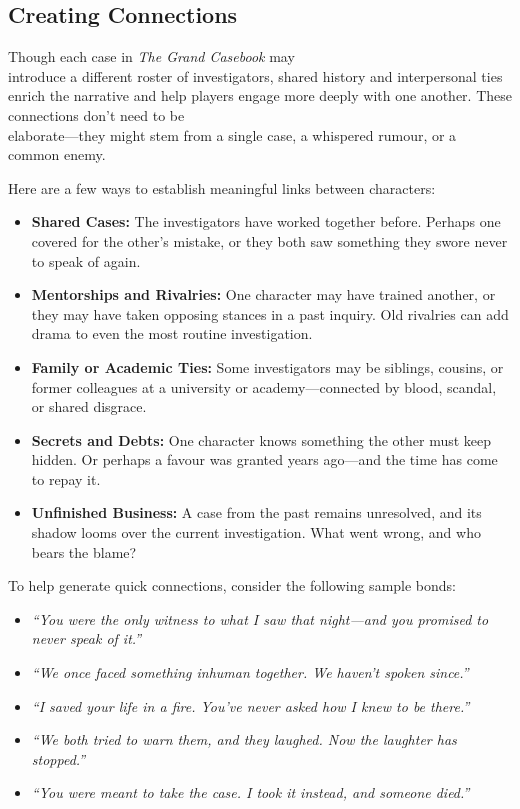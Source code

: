 \subsection{Creating Connections}

Though each case in \textit{The Grand Casebook} may\\ introduce a different roster of investigators, shared history and interpersonal ties enrich the narrative and help players engage more deeply with one another. These connections don't need to be\\ elaborate—they might stem from a single case, a whispered rumour, or a common enemy.

Here are a few ways to establish meaningful links between characters:

\begin{itemize}\raggedright
    \item \textbf{Shared Cases:} The investigators have worked together before. Perhaps one covered for the other's mistake, or they both saw something they swore never to speak of again.
    
    \item \textbf{Mentorships and Rivalries:} One character may have trained another, or they may have taken opposing stances in a past inquiry. Old rivalries can add drama to even the most routine investigation.
    
    \item \textbf{Family or Academic Ties:} Some investigators may be siblings, cousins, or former colleagues at a university or academy—connected by blood, scandal, or shared disgrace.
    
    \item \textbf{Secrets and Debts:} One character knows something the other must keep hidden. Or perhaps a favour was granted years ago—and the time has come to repay it.
    
    \item \textbf{Unfinished Business:} A case from the past remains unresolved, and its shadow looms over the current investigation. What went wrong, and who bears the blame?
\end{itemize}

To help generate quick connections, consider the following sample bonds:

\begin{itemize}\raggedright
    \item \textit{“You were the only witness to what I saw that night—and you promised to never speak of it.”}
    \item \textit{“We once faced something inhuman together. We haven’t spoken since.”}
    \item \textit{“I saved your life in a fire. You’ve never asked how I knew to be there.”}
    \item \textit{“We both tried to warn them, and they laughed. Now the laughter has stopped.”}
    \item \textit{“You were meant to take the case. I took it instead, and someone died.”}
\end{itemize}

